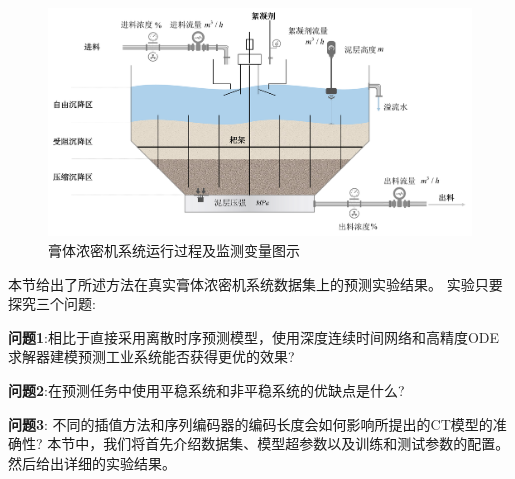 \begin{figure}[t]
\centering
\includegraphics[width=\linewidth]{figures/chapter3/thickener.pdf}
\caption{
膏体浓密机系统运行过程及监测变量图示
}
\label{fig:nfca_thickener}
\end{figure}

本节给出了所述方法在真实膏体浓密机系统数据集上的预测实验结果。
实验只要探究三个问题:

\textbf{问题1}:相比于直接采用离散时序预测模型，使用深度连续时间网络和高精度ODE求解器建模预测工业系统能否获得更优的效果?

\textbf{问题2}:在预测任务中使用平稳系统和非平稳系统的优缺点是什么?

\textbf{问题3}: 不同的插值方法和序列编码器的编码长度会如何影响所提出的CT模型的准确性?
本节中，我们将首先介绍数据集、模型超参数以及训练和测试参数的配置。然后给出详细的实验结果。

